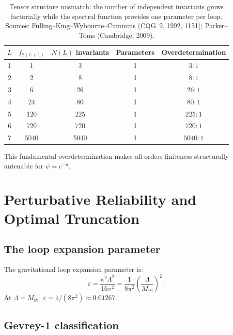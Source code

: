 \documentclass[12pt,a4paper]{article}
\newcommand{\Lam}{\Lambda}
\begin{document}
\begin{table}[H]
\centering
\begin{tabular}{ccccc}
\toprule
$L$ & $f_{2(L+1)}$ & $N(L)$ invariants & Parameters & Overdetermination \\
\midrule
1 & 1 & 3 & 1 & $3:1$ \\
2 & 2 & 8 & 1 & $8:1$ \\
3 & 6 & 26 & 1 & $26:1$ \\
4 & 24 & 80 & 1 & $80:1$ \\
5 & 120 & 225 & 1 & $225:1$ \\
6 & 720 & 720 & 1 & $720:1$ \\
7 & 5040 & 5040 & 1 & $5040:1$ \\
\bottomrule
\end{tabular}
\caption{Tensor structure mismatch: the number of independent invariants
grows factorially while the spectral function provides one parameter per loop.
Sources: Fulling--King--Wybourne--Cummins (CQG~9, 1992, 1151);
Parker--Toms (Cambridge, 2009).}
\label{tab:invariants}
\end{table}

This fundamental overdetermination makes all-orders finiteness structurally
untenable for $\psi = e^{-u}$.

\section{Perturbative Reliability and Optimal Truncation}
\label{sec:reliability}

\subsection{The loop expansion parameter}

The gravitational loop expansion parameter is:
\begin{equation}\label{eq:epsilon}
  \varepsilon = \frac{\kappa^2 \Lam^2}{16\pi^2}
  = \frac{1}{8\pi^2}\left(\frac{\Lam}{M_{\mathrm{Pl}}}\right)^2.
\end{equation}
At $\Lam = M_{\mathrm{Pl}}$: $\varepsilon = 1/(8\pi^2) \approx 0.01267$.

\subsection{Gevrey-1 classification}
\end{document}
